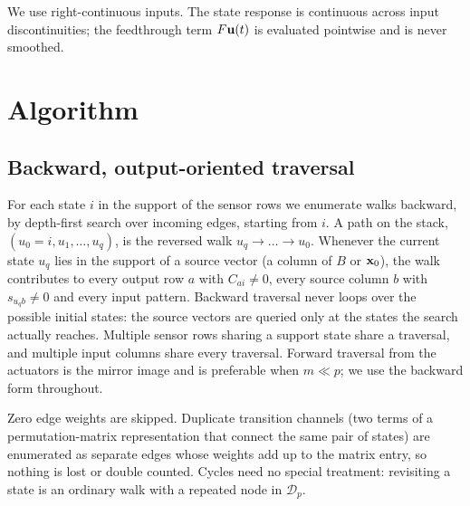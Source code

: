 We use right-continuous inputs. The state response is continuous across input discontinuities; the feedthrough term $F{\bf u}(t)$ is evaluated pointwise and is never smoothed.

\section{Algorithm}\label{sec:algorithm}

\subsection{Backward, output-oriented traversal}
For each state $i$ in the support of the sensor rows we enumerate walks backward, by depth-first search over incoming edges, starting from $i$. A path on the stack, $(u_0=i,u_1,\dots,u_q)$, is the reversed walk $u_q\to\dots\to u_0$. Whenever the current state $u_q$ lies in the support of a source vector (a column of $B$ or ${\bf x}_0$), the walk contributes to every output row $a$ with $C_{ai}\ne0$, every source column $b$ with $s_{u_q b}\neq0$ and every input pattern. Backward traversal never loops over the possible initial states: the source vectors are queried only at the states the search actually reaches. Multiple sensor rows sharing a support state share a traversal, and multiple input columns share every traversal. Forward traversal from the actuators is the mirror image and is preferable when $m\ll p$; we use the backward form throughout.

Zero edge weights are skipped. Duplicate transition channels (two terms of a permutation-matrix representation that connect the same pair of states) are enumerated as separate edges whose weights add up to the matrix entry, so nothing is lost or double counted. Cycles need no special treatment: revisiting a state is an ordinary walk with a repeated node in $\mathcal{D}_p$.

